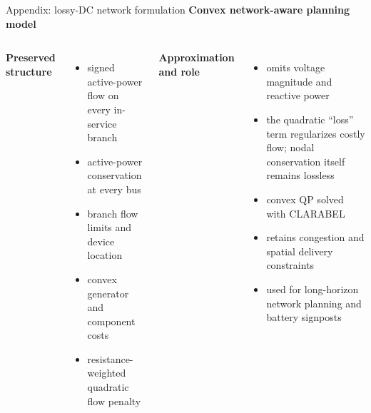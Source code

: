\documentclass[aspectratio=169,11pt]{beamer}
\newcommand{\tightitems}{\setlength{\itemsep}{0.42em}}
\begin{document}
\begin{frame}{Appendix: lossy-DC network formulation}
  \textbf{Convex network-aware planning model}
  \begin{columns}[T,onlytextwidth]
    \textbf{Preserved structure}
    \begin{itemize}\small\tightitems
      \item signed active-power flow on every in-service branch
      \item active-power conservation at every bus
      \item branch flow limits and device location
      \item convex generator and component costs
      \item resistance-weighted quadratic flow penalty
    \end{itemize}
    \textbf{Approximation and role}
    \begin{itemize}\small\tightitems
      \item omits voltage magnitude and reactive power
      \item the quadratic ``loss'' term regularizes costly flow; nodal conservation itself remains lossless
      \item convex QP solved with CLARABEL
      \item retains congestion and spatial delivery constraints
      \item used for long-horizon network planning and battery signposts
    \end{itemize}
  \end{columns}
\end{frame}
\end{document}
